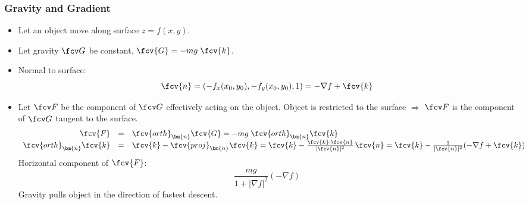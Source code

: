 \begin{frame}
\frametitle{Gravity and Gradient}
\begin{itemize}
\item Let an object move along surface $z=f(x,y)$.
\item Let gravity $\fcv G$ be constant, $\fcv{G}= -mg\; \fcv{k}$.
\item  Normal to surface:
$$\fcv{n} = ( -f_x(x_0,y_0), -f_y(x_0,y_0), 1) = -\nabla f + \fcv{k}$$
\item Let $\fcv F$ be the component of $\fcv G$ effectively acting on the object. Object is restricted to the surface $\Rightarrow$ $\fcv F$ is the component of $\fcv G$ tangent to the surface.
\[\begin{array}{rcl}
\fcv{F} &=& \fcv{orth}_{\bm{n}} \fcv{G} = -mg \; \fcv{orth}_{\bm{n}} \fcv{k}\\
\fcv{orth}_{\bm{n}} \fcv{k} &=& \fcv{k} - \fcv{proj}_{\bm{n}} \fcv{k} = \fcv{k} - \frac{\fcv{k}\cdot \fcv{n}}{|\fcv{n}|^2} \, \fcv{n} = \fcv{k} - \frac{1}{|\fcv{n}|^2} (-\nabla f + \fcv{k})
\end{array}
\]
\pause
Horizontal component of $\fcv{F}$:
%
$$\frac{mg}{1+|\nabla f|^2} (-\nabla f)$$
\pause
Gravity pulls object in the direction of fastest descent.

\end{itemize}
\end{frame}
